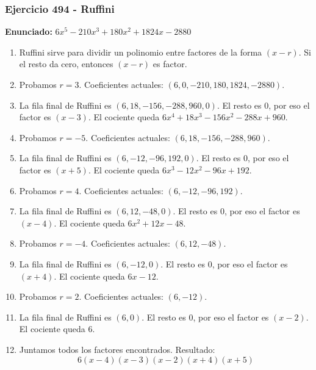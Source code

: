 \documentclass[11pt,a4paper]{article}
\begin{document}
\subsubsection*{Ejercicio 494 - Ruffini}
\textbf{Enunciado:} $ 6 x^{5} - 210 x^{3} + 180 x^{2} + 1824 x - 2880 $\par
\begin{enumerate}[leftmargin=2em]
\item Ruffini sirve para dividir un polinomio entre factores de la forma \((x-r)\). Si el resto da cero, entonces \((x-r)\) es factor.
\item Probamos \(r=3\). Coeficientes actuales: \((6, 0, -210, 180, 1824, -2880)\).
\item La fila final de Ruffini es \((6, 18, -156, -288, 960, 0)\). El resto es \(0\), por eso el factor es \((x-3)\). El cociente queda \(6 x^{4} + 18 x^{3} - 156 x^{2} - 288 x + 960\).
\item Probamos \(r=-5\). Coeficientes actuales: \((6, 18, -156, -288, 960)\).
\item La fila final de Ruffini es \((6, -12, -96, 192, 0)\). El resto es \(0\), por eso el factor es \((x+5)\). El cociente queda \(6 x^{3} - 12 x^{2} - 96 x + 192\).
\item Probamos \(r=4\). Coeficientes actuales: \((6, -12, -96, 192)\).
\item La fila final de Ruffini es \((6, 12, -48, 0)\). El resto es \(0\), por eso el factor es \((x-4)\). El cociente queda \(6 x^{2} + 12 x - 48\).
\item Probamos \(r=-4\). Coeficientes actuales: \((6, 12, -48)\).
\item La fila final de Ruffini es \((6, -12, 0)\). El resto es \(0\), por eso el factor es \((x+4)\). El cociente queda \(6 x - 12\).
\item Probamos \(r=2\). Coeficientes actuales: \((6, -12)\).
\item La fila final de Ruffini es \((6, 0)\). El resto es \(0\), por eso el factor es \((x-2)\). El cociente queda \(6\).
\item Juntamos todos los factores encontrados. Resultado: \[\boxed{6 \left(x - 4\right) \left(x - 3\right) \left(x - 2\right) \left(x + 4\right) \left(x + 5\right)}\]
\end{enumerate}

\vspace{0.2cm}
\end{document}
